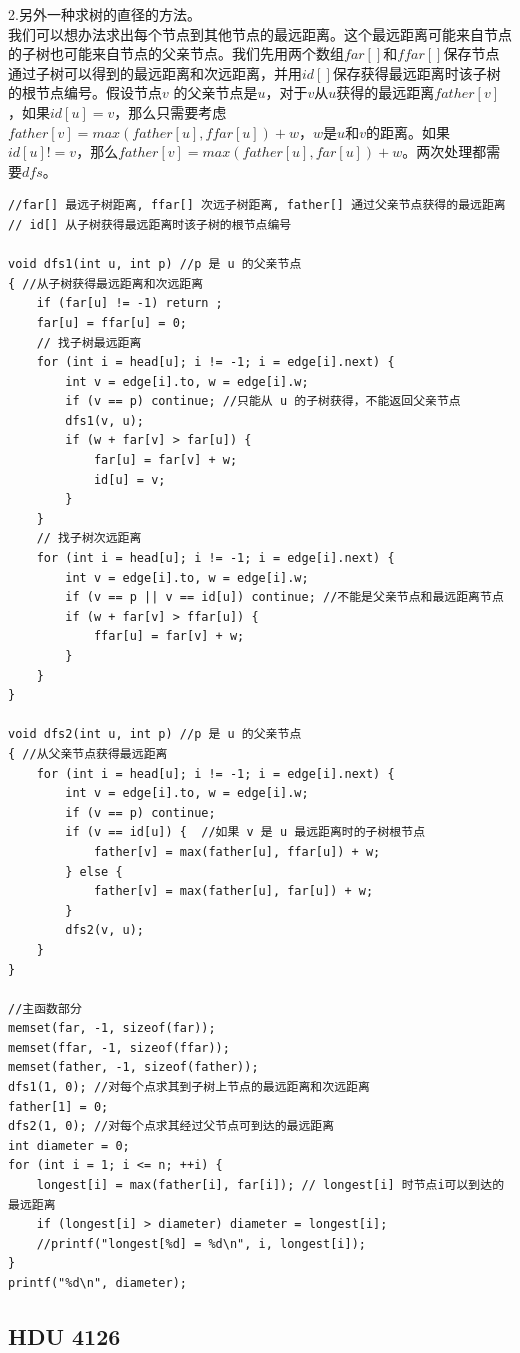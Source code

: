 2.另外一种求树的直径的方法。 \\
我们可以想办法求出每个节点到其他节点的最远距离。这个最远距离可能来自节点的子树也可能来自节点的父亲节点。我们先用两个数组$far[]$和$ffar[]$保存节点通过子树可以得到的最远距离和次远距离，并用$id[]$保存获得最远距离时该子树的根节点编号。假设节点$v$ 的父亲节点是$u$，对于$v$从$u$获得的最远距离$father[v]$，如果$id[u]=v$，那么只需要考虑$father[v] =max(father[u] ,ffar[u]) + w$，$w$是$u$和$v$的距离。如果$id[u]!=v$，那么$father[v] = max(father[u],far[u])+w$。两次处理都需要$dfs$。
\begin{lstlisting}
//far[] 最远子树距离, ffar[] 次远子树距离, father[] 通过父亲节点获得的最远距离
// id[] 从子树获得最远距离时该子树的根节点编号

void dfs1(int u, int p) //p 是 u 的父亲节点
{ //从子树获得最远距离和次远距离
	if (far[u] != -1) return ;
	far[u] = ffar[u] = 0;
	// 找子树最远距离
	for (int i = head[u]; i != -1; i = edge[i].next) {
		int v = edge[i].to, w = edge[i].w;
		if (v == p) continue; //只能从 u 的子树获得，不能返回父亲节点
		dfs1(v, u);
		if (w + far[v] > far[u]) {
			far[u] = far[v] + w;
			id[u] = v;
		}
	}
	// 找子树次远距离
	for (int i = head[u]; i != -1; i = edge[i].next) {
		int v = edge[i].to, w = edge[i].w;
		if (v == p || v == id[u]) continue; //不能是父亲节点和最远距离节点
 		if (w + far[v] > ffar[u]) {
			ffar[u] = far[v] + w;
		}
	}
}

void dfs2(int u, int p) //p 是 u 的父亲节点
{ //从父亲节点获得最远距离
	for (int i = head[u]; i != -1; i = edge[i].next) {
		int v = edge[i].to, w = edge[i].w;
		if (v == p) continue;
		if (v == id[u]) {  //如果 v 是 u 最远距离时的子树根节点
			father[v] = max(father[u], ffar[u]) + w;
		} else {
			father[v] = max(father[u], far[u]) + w;
		}
		dfs2(v, u);
	}
}

//主函数部分
memset(far, -1, sizeof(far));
memset(ffar, -1, sizeof(ffar));
memset(father, -1, sizeof(father));
dfs1(1, 0); //对每个点求其到子树上节点的最远距离和次远距离
father[1] = 0;
dfs2(1, 0); //对每个点求其经过父节点可到达的最远距离
int diameter = 0;
for (int i = 1; i <= n; ++i) {
	longest[i] = max(father[i], far[i]); // longest[i] 时节点i可以到达的最远距离
	if (longest[i] > diameter) diameter = longest[i];
	//printf("longest[%d] = %d\n", i, longest[i]);
}
printf("%d\n", diameter);
\end{lstlisting}

\subsection{HDU 4126}

